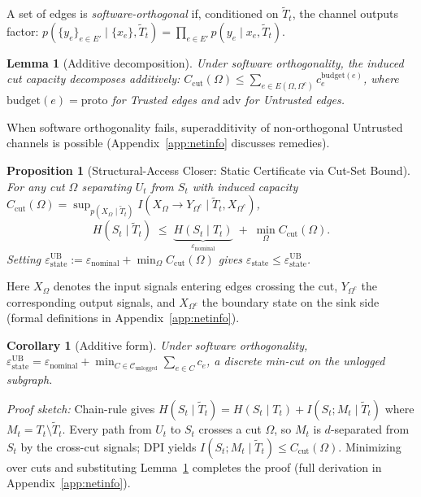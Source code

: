 \documentclass{article}
\newtheorem{lemma}{Lemma}
\newtheorem{proposition}{Proposition}
\newtheorem{corollary}{Corollary}
\begin{document}
A set of edges is \emph{software-orthogonal} if, conditioned on $\tilde T_t$, the channel outputs factor: $p(\{y_e\}_{e \in E'} \mid \{x_e\}, \tilde T_t) = \prod_{e \in E'} p(y_e \mid x_e, \tilde T_t)$.

\begin{lemma}[Additive decomposition]
\label{lem:ortho-decomp}
Under software orthogonality, the induced cut capacity decomposes additively:
$C_\text{cut}(\Omega) \leq \sum_{e \in E(\Omega, \Omega^c)} c_e^{\text{budget}(e)}$,
where $\text{budget}(e) = \text{proto}$ for Trusted edges and $\text{adv}$ for Untrusted edges.
\end{lemma}

When software orthogonality fails, superadditivity of non-orthogonal Untrusted channels is possible (Appendix~\ref{app:netinfo} discusses remedies).

\begin{proposition}[Structural-Access Closer: Static Certificate via Cut-Set Bound]
\label{prop:static-ub}
For any cut $\Omega$ separating $U_t$ from $S_t$ with induced capacity $C_\text{cut}(\Omega) = \sup_{p(X_\Omega \mid \tilde T_t)} I(X_\Omega \to Y_{\Omega^c} \mid \tilde T_t, X_{\Omega^c})$,
\[
  H(S_t \mid \tilde T_t) \;\leq\; \underbrace{H(S_t \mid T_t)}_{\varepsilon_\text{nominal}} \;+\; \min_{\Omega} C_\text{cut}(\Omega).
\]
Setting $\varepsilon_\text{state}^\text{UB} := \varepsilon_\text{nominal} + \min_\Omega C_\text{cut}(\Omega)$ gives $\varepsilon_\text{state} \leq \varepsilon_\text{state}^\text{UB}$.
\end{proposition}

Here $X_\Omega$ denotes the input signals entering edges crossing the cut, $Y_{\Omega^c}$ the corresponding output signals, and $X_{\Omega^c}$ the boundary state on the sink side (formal definitions in Appendix~\ref{app:netinfo}).

\begin{corollary}[Additive form]
\label{cor:additive-ub}
Under software orthogonality, $\varepsilon_\text{state}^\text{UB} = \varepsilon_\text{nominal} + \min_{C \in \mathcal{C}_\text{unlogged}} \sum_{e \in C} c_e$, a discrete min-cut on the unlogged subgraph.
\end{corollary}

\emph{Proof sketch:} Chain-rule gives $H(S_t \mid \tilde T_t) = H(S_t \mid T_t) + I(S_t; M_t \mid \tilde T_t)$ where $M_t = T_t \setminus \tilde T_t$. Every path from $U_t$ to $S_t$ crosses a cut $\Omega$, so $M_t$ is $d$-separated from $S_t$ by the cross-cut signals; DPI yields $I(S_t; M_t \mid \tilde T_t) \leq C_\text{cut}(\Omega)$. Minimizing over cuts and substituting Lemma~\ref{lem:ortho-decomp} completes the proof (full derivation in Appendix~\ref{app:netinfo}).
\end{document}
